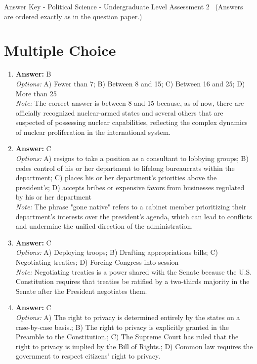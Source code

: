 \documentclass[12pt]{article}
\begin{document}
\begin{center}
Answer Key - Political Science - Undergraduate Level Assessment 2 \
\small (Answers are ordered exactly as in the question paper.)
\end{center}

\section*{Multiple Choice}
\begin{enumerate}[label=\arabic*.]
\item \textbf{Answer:} B
\\ \textit{Options:} A) Fewer than 7; B) Between 8 and 15; C) Between 16 and 25; D) More than 25
\\ \textit{Note:} The correct answer is between 8 and 15 because, as of now, there are officially recognized nuclear-armed states and several others that are suspected of possessing nuclear capabilities, reflecting the complex dynamics of nuclear proliferation in the international system.
\item \textbf{Answer:} C
\\ \textit{Options:} A) resigns to take a position as a consultant to lobbying groups; B) cedes control of his or her department to lifelong bureaucrats within the department; C) places his or her department's priorities above the president's; D) accepts bribes or expensive favors from businesses regulated by his or her department
\\ \textit{Note:} The phrase "gone native" refers to a cabinet member prioritizing their department's interests over the president's agenda, which can lead to conflicts and undermine the unified direction of the administration.
\item \textbf{Answer:} C
\\ \textit{Options:} A) Deploying troops; B) Drafting appropriations bills; C) Negotiating treaties; D) Forcing Congress into session
\\ \textit{Note:} Negotiating treaties is a power shared with the Senate because the U.S. Constitution requires that treaties be ratified by a two-thirds majority in the Senate after the President negotiates them.
\item \textbf{Answer:} C
\\ \textit{Options:} A) The right to privacy is determined entirely by the states on a case-by-case basis.; B) The right to privacy is explicitly granted in the Preamble to the Constitution.; C) The Supreme Court has ruled that the right to privacy is implied by the Bill of Rights.; D) Common law requires the government to respect citizens' right to privacy.

\end{enumerate}
\end{document}
